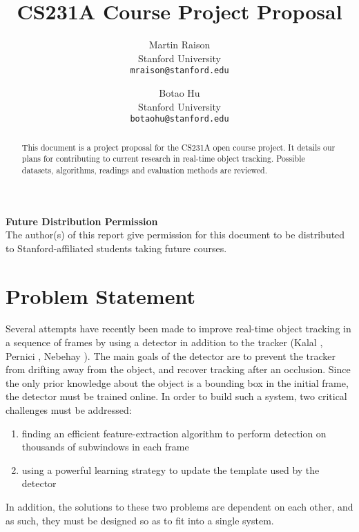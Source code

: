 \documentclass[10pt,twocolumn,letterpaper]{article}
\begin{document}
\title{CS231A Course Project Proposal}

\author{Martin Raison\\
Stanford University\\
{\tt\small mraison@stanford.edu}
\and
Botao Hu\\
Stanford University\\
{\tt\small botaohu@stanford.edu}
}

\maketitle
\thispagestyle{empty}

\begin{abstract}
   This document is a project proposal for the CS231A open course project. It details our plans for contributing to current research in real-time object tracking. Possible datasets, algorithms, readings  and evaluation methods are reviewed.
\end{abstract}

\noindent\large\textbf{Future Distribution Permission}\\
\indent The author(s) of this report give permission for this document to be distributed to Stanford-affiliated students taking future courses.

\section{Problem Statement}

Several attempts have recently been made to improve real-time object tracking in a sequence of frames by using a detector in addition to the tracker (Kalal \etal \cite{kalal2012tracking}, Pernici \etal \cite{pernicifacehugger}, Nebehay \etal \cite{nebehay2011evaluation}). The main goals of the detector are to prevent the tracker from drifting away from the object, and recover tracking after an occlusion. Since the only prior knowledge about the object is a bounding box in the initial frame, the detector must be trained online. In order to build such a system, two critical challenges must be addressed:
\begin{enumerate}
\item
finding an efficient feature-extraction algorithm to perform detection on thousands of subwindows in each frame
\item
using a powerful learning strategy to update the template used by the detector
\end{enumerate}
In addition, the solutions to these two problems are dependent on each other, and as such, they must be designed so as to fit into a single system.
\end{document}
